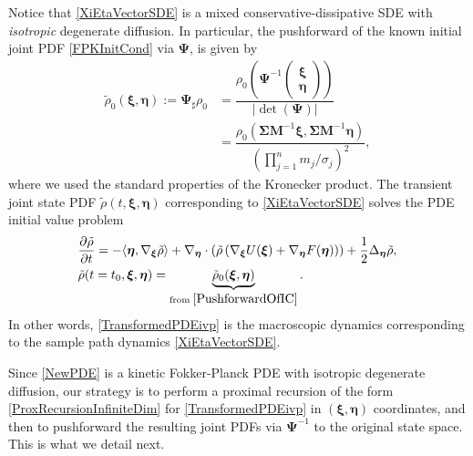 \documentclass[10pt,twocolumn]{IEEEtran}
\begin{document}
Notice that \eqref{XiEtaVectorSDE} is a mixed conservative-dissipative SDE with \emph{isotropic} degenerate diffusion. In particular, the pushforward of the known initial joint PDF \eqref{FPKInitCond} via $\bm{\Psi}$, is given by
\begin{align}
\tilde{\rho}_{0}(\bm{\xi},\bm{\eta}) := \bm{\Psi}_{\sharp} \rho_{0} 
&= \dfrac{\rho_{0}\left(\bm{\Psi}^{-1} \begin{pmatrix}
\bm{\xi}\\
\bm{\eta}	
\end{pmatrix}\right)}{|\det\left(\bm{\Psi}\right)|} \nonumber\\
&= \dfrac{\rho_{0}\left(\bm{\Sigma}\bm{M}^{-1}\bm{\xi},\bm{\Sigma}\bm{M}^{-1}\bm{\eta}\right)}{\left(\displaystyle\prod_{j=1}^{n}m_{j}/\sigma_{j}\right)^{\!2}},
\label{PushforwardOfIC}	
\end{align}
where we used the standard properties of the Kronecker product. The transient joint state PDF $\tilde{\rho}(t,\bm{\xi},\bm{\eta})$ corresponding to \eqref{XiEtaVectorSDE} solves the PDE initial value problem
\begin{subequations}
\begin{align}
&\dfrac{\partial\tilde{\rho}}{\partial t} = -\langle\bm{\eta},\nabla_{\bm{\xi}}\tilde{\rho}\rangle + \nabla_{\bm{\eta}}\cdot\left(\tilde{\rho}\left(\nabla_{\bm{
\xi}}U(\bm{\xi})+\nabla_{\bm{\eta}}F(\bm{\eta})\right)\right) + \dfrac{1}{2}\Delta_{\bm{\eta}}\tilde{\rho}, \label{NewPDE}\\
&\tilde{\rho}(t=t_{0},\bm{\xi},\bm{\eta}) = \underbrace{\tilde{\rho}_{0}(\bm{\xi},\bm{\eta})}_{\text{from}\;\eqref{PushforwardOfIC}}. \label{NewIC}	
\end{align}
\label{TransformedPDEivp}	
\end{subequations}
In other words, \eqref{TransformedPDEivp} is the macroscopic dynamics corresponding to the sample path dynamics \eqref{XiEtaVectorSDE}.

Since \eqref{NewPDE} is a kinetic Fokker-Planck PDE with isotropic degenerate diffusion, our strategy is to perform a proximal recursion of the form \eqref{ProxRecursionInfiniteDim} for \eqref{TransformedPDEivp} in $(\bm{\xi},\bm{\eta})$ coordinates, and then to pushforward the resulting joint PDFs via $\bm{\Psi}^{-1}$ to the original state space. This is what we detail next.
\end{document}
